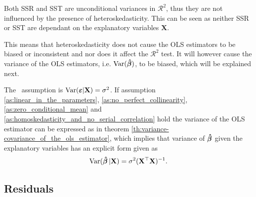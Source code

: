Both SSR and SST are unconditional variances in $\mathcal{R}^2$, thus they are not influenced by the presence of heteroskedasticity. This can be seen as neither SSR or SST are dependant on the explanatory variables $\textbf{X}$. 

This means that heteroskedasticity does not cause the OLS estimators to be biased or inconsistent and nor does it affect the $\mathcal{R}^2$ test. 
It will however cause the variance of the OLS estimators, i.e. $\operatorname{\text{Var}}(\operatorname{\boldsymbol{\hat{\beta}}})$, to be biased, which will be explained next.  

The \homo \ assumption is $\operatorname{\text{Var}}(\boldsymbol{\varepsilon} | \mathbf{X}) = \sigma^2$. If assumption \ref{as:linear_in_the_parameters}, \ref{as:no_perfect_collinearity}, \ref{as:zero_conditional_mean} and \ref{as:homoskedasticity_and_no_serial_correlation} hold the variance of the OLS estimator can be expressed as in theorem \ref{th:variance-covariance_of_the_ols_estimator}, which implies that variance of $\operatorname{\boldsymbol{\hat{\beta}}}$ given the explanatory variables has an explicit form given as
\begin{align*}
    \operatorname{\text{Var}}(\operatorname{\boldsymbol{\hat{\beta}}} | \mathbf{X}) = \sigma^2(\mathbf{X}^\top\mathbf{X})^{-1}.
\end{align*}

\subsection{Residuals}

